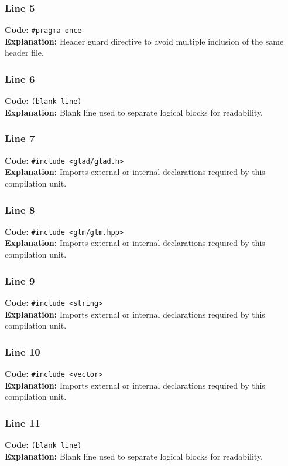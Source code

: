 \documentclass[11pt,a4paper]{article}
\begin{document}
\subsubsection*{Line 5}
\textbf{Code:} \verb|#pragma once|\\
\textbf{Explanation:} Header guard directive to avoid multiple inclusion of the same header file.

\subsubsection*{Line 6}
\textbf{Code:} \texttt{(blank line)}\\
\textbf{Explanation:} Blank line used to separate logical blocks for readability.

\subsubsection*{Line 7}
\textbf{Code:} \verb|#include <glad/glad.h>|\\
\textbf{Explanation:} Imports external or internal declarations required by this compilation unit.

\subsubsection*{Line 8}
\textbf{Code:} \verb|#include <glm/glm.hpp>|\\
\textbf{Explanation:} Imports external or internal declarations required by this compilation unit.

\subsubsection*{Line 9}
\textbf{Code:} \verb|#include <string>|\\
\textbf{Explanation:} Imports external or internal declarations required by this compilation unit.

\subsubsection*{Line 10}
\textbf{Code:} \verb|#include <vector>|\\
\textbf{Explanation:} Imports external or internal declarations required by this compilation unit.

\subsubsection*{Line 11}
\textbf{Code:} \texttt{(blank line)}\\
\textbf{Explanation:} Blank line used to separate logical blocks for readability.
\end{document}
